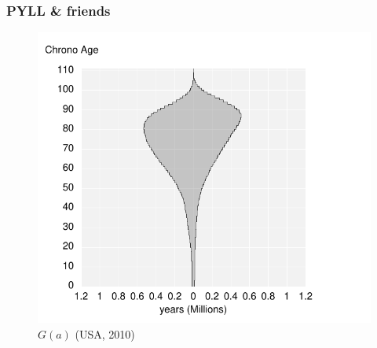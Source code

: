 \documentclass{beamer}
\begin{document}
\begin{frame}
\frametitle{PYLL \& friends}
\vspace{-1cm}
\begin{figure}[b]
    \centering
    \includegraphics[scale=.7]{Figures/f6_AgesWon.pdf}
    \caption{$G(a)$ (USA, 2010)}
\end{figure} 
\end{frame}

\end{document}
